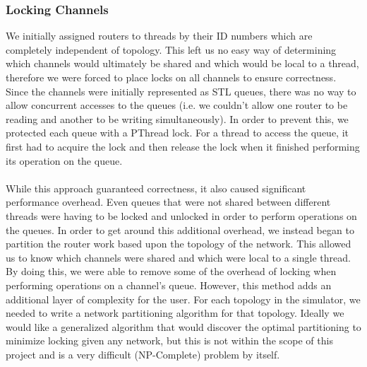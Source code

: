 \documentclass[twocolumn]{article}
\begin{document}
\subsubsection{Locking Channels}
We initially assigned routers to threads by their ID numbers which are completely independent of
topology.  This left us no easy way of determining which channels would
ultimately be shared and which would be local to a thread, therefore we
were forced to place locks on all channels to ensure correctness.  Since
the channels were initially represented as STL queues, there was no way to
allow concurrent accesses to the queues (i.e. we couldn't allow one router
to be reading and another to be writing simultaneously).  In order to
prevent this, we protected each queue with a PThread lock.  For a thread
to access the queue, it first had to acquire the lock and then release the
lock when it finished performing its operation on the queue.\\
~\\
While this approach guaranteed correctness, it also caused significant
performance overhead.  Even queues that were not shared between different
threads were having to be locked and unlocked in order to perform
operations on the queues.  In order to get around this additional
overhead, we instead began to partition the router work based upon the
topology of the network.  This allowed us to know which channels
were shared and which were local to a single thread.  By doing this, we
were able to remove some of the overhead of locking when performing
operations on a channel's queue. However, this method adds an additional layer of complexity for the user. For each topology in the simulator, we needed to write a network partitioning algorithm for that topology. Ideally we would like a generalized algorithm that would discover the optimal partitioning to minimize locking given any network, but this is not within the scope of this project and is a very difficult (NP-Complete) problem by itself.
\end{document}
